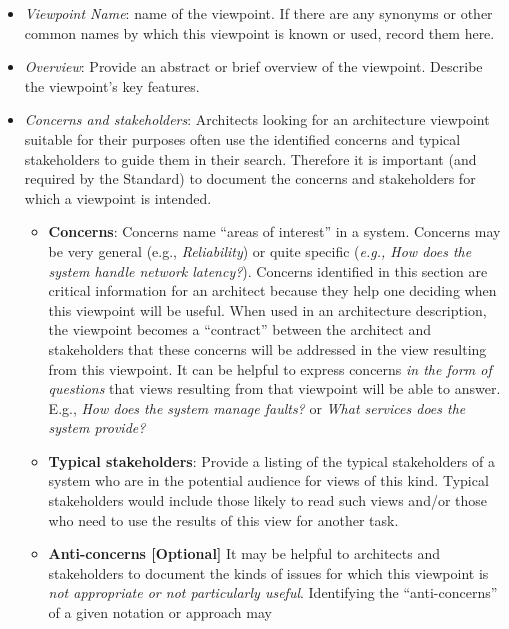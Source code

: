 \begin{itemize}
\item {\em Viewpoint Name}: name of the viewpoint. If there are any synonyms or other common names by which this viewpoint is
known or used, record them here.
\item {\em Overview}: Provide an abstract or brief overview of the viewpoint. 
Describe the viewpoint's key features.
\item {\em Concerns and stakeholders}: Architects looking for an architecture viewpoint suitable for their
purposes often use the identified concerns and typical stakeholders to
guide them in their search.  Therefore it is important (and required
by the Standard) to document the concerns and stakeholders for which a
viewpoint is intended.
\begin{itemize}
\item {\bf Concerns}: %
Concerns name ``areas of interest'' in a system.
Concerns may be very general (e.g., \textit{Reliability}) or quite
specific (\textit{e.g., How does the system handle network latency?}).
Concerns identified in this section are critical information for an
architect because they help one deciding when this viewpoint will be
useful.
When used in an architecture description, the viewpoint becomes a
``contract'' between the architect and stakeholders that these
concerns will be addressed in the view resulting from this viewpoint.
It can be helpful to express concerns \emph{in the form of questions}
that views resulting from that viewpoint will be able to answer. E.g., {\em How does the system manage faults?} or {\em What services does the system provide?}
\item {\bf Typical stakeholders}: Provide a listing of the typical stakeholders of a system who
  are in the potential audience for views of this kind.
Typical stakeholders would include those likely to read such views
and/or those who need to use the results of this view for another
task.
\item {\bf Anti-concerns [Optional]} It may be helpful to architects and stakeholders to
document the kinds of issues for which this viewpoint is \emph{not
  appropriate or not particularly useful}.
Identifying the ``anti-concerns'' of a given notation or approach may

\end{itemize}
\end{itemize}
